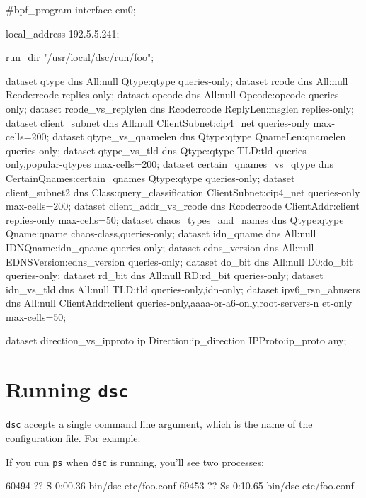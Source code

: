 \documentclass{report}
\begin{document}
\begin{MyVerbatim}
#bpf_program
interface em0;

local_address 192.5.5.241;

run_dir "/usr/local/dsc/run/foo";

dataset qtype dns All:null Qtype:qtype queries-only;
dataset rcode dns All:null Rcode:rcode replies-only;
dataset opcode dns All:null Opcode:opcode queries-only;
dataset rcode_vs_replylen dns Rcode:rcode ReplyLen:msglen replies-only;
dataset client_subnet dns All:null ClientSubnet:cip4_net queries-only
        max-cells=200;
dataset qtype_vs_qnamelen dns Qtype:qtype QnameLen:qnamelen queries-only;
dataset qtype_vs_tld dns Qtype:qtype TLD:tld queries-only,popular-qtypes
        max-cells=200;
dataset certain_qnames_vs_qtype dns CertainQnames:certain_qnames
        Qtype:qtype queries-only;
dataset client_subnet2 dns Class:query_classification
        ClientSubnet:cip4_net queries-only max-cells=200;
dataset client_addr_vs_rcode dns Rcode:rcode ClientAddr:client
        replies-only max-cells=50;
dataset chaos_types_and_names dns Qtype:qtype Qname:qname
        chaos-class,queries-only;
dataset idn_qname dns All:null IDNQname:idn_qname queries-only;
dataset edns_version dns All:null EDNSVersion:edns_version queries-only;
dataset do_bit dns All:null D0:do_bit queries-only;
dataset rd_bit dns All:null RD:rd_bit queries-only;
dataset idn_vs_tld dns All:null TLD:tld queries-only,idn-only;
dataset ipv6_rsn_abusers dns All:null ClientAddr:client
        queries-only,aaaa-or-a6-only,root-servers-n et-only max-cells=50;

dataset direction_vs_ipproto ip Direction:ip_direction IPProto:ip_proto
        any;
\end{MyVerbatim}

\section{Running {\tt dsc}}

{\tt dsc\/} accepts a single command line argument, which is
the name of the configuration file.  For example:

\begin{MyVerbatim}
\end{MyVerbatim}

If you run {\tt ps} when {\tt dsc} is running, you'll see two processes:

\begin{MyVerbatim}
60494  ??  S      0:00.36 bin/dsc etc/foo.conf
69453  ??  Ss     0:10.65 bin/dsc etc/foo.conf
\end{MyVerbatim}
\end{document}
